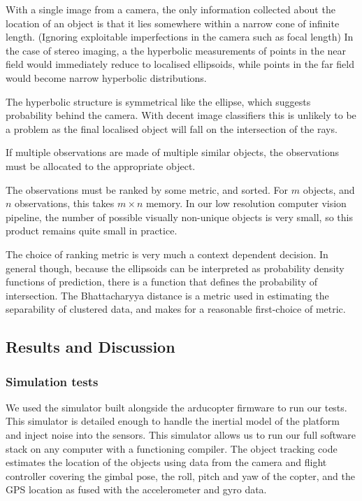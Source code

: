 \documentclass{article}
\newcounter{subsubsubsection}[subsubsection]
\begin{document}
        With a single image from a camera, the only information collected about the location of an object is that it lies somewhere within a narrow cone of infinite length.  (Ignoring exploitable imperfections in the camera such as focal length)
        In the case of stereo imaging, a the hyperbolic measurements of points in the near field would immediately reduce to localised ellipsoids, while points in the far field would become narrow hyperbolic distributions.

        The hyperbolic structure is symmetrical like the ellipse, which suggests probability behind the camera.  With decent image classifiers this is unlikely to be a problem as the final localised object will fall on the intersection of the rays.

        If multiple observations are made of multiple similar objects, the observations must be allocated to the appropriate object.

        The observations must be ranked by some metric, and sorted.  For \(m\) objects, and \(n\) observations, this takes \(m \times n\) memory.  In our low resolution computer vision pipeline, the number of possible visually non-unique objects is very small, so this product remains quite small in practice.

        The choice of ranking metric is very much a context dependent decision.  In general though, because the ellipsoids can be interpreted as probability density functions of prediction, there is a function that defines the probability of intersection. The Bhattacharyya distance is a metric used in estimating the separability of clustered data, and makes for a reasonable first-choice of metric.


  \subsection{Results and Discussion}

    \subsubsection{Simulation tests}
      We used the simulator built alongside the arducopter firmware to run our tests.  This simulator is detailed enough to handle the inertial model of the platform and inject noise into the sensors.
      This simulator allows us to run our full software stack on any computer with a functioning compiler.
      The object tracking code estimates the location of the objects using data from the camera and flight controller covering the gimbal pose, the roll, pitch and yaw of the copter, and the GPS location as fused with the accelerometer and gyro data.
\end{document}
